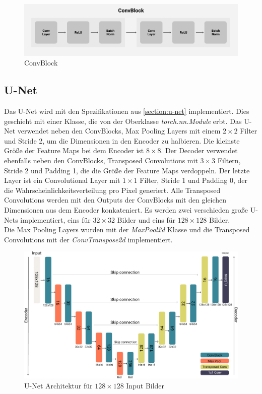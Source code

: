 \begin{figure}[H]
  \centering
  \includegraphics[width=1\textwidth]{resources/networks/convblock.png}
  \caption{ConvBlock}
  \label{image:convBlock}
\end{figure}

\subsection{U-Net}
Das U-Net wird mit den Spezifikationen aus \ref{section:u-net} implementiert. Dies geschieht mit einer Klasse, die von der Oberklasse
\textit{torch.nn.Module} erbt. Das U-Net verwendet neben den ConvBlocks, Max Pooling Layers mit einem $2 \times 2$ Filter und Stride 2,
um die Dimensionen in den Encoder zu halbieren. Die kleinste Größe der Feature Maps bei dem Encoder ist $8 \times 8$. 
Der Decoder verwendet ebenfalls neben den ConvBlocks, Transposed Convolutions mit $3 \times 3$ 
Filtern, Stride 2 und Padding 1, die die Größe der Feature Maps verdoppeln. Der letzte Layer ist ein Convolutional Layer mit $1 \times 1$ Filter, 
Stride 1 und Padding 0, der die
Wahrscheinlichkeitsverteilung pro Pixel generiert. Alle Transposed Convolutions werden mit den Outputs der ConvBlocks mit den gleichen
Dimensionen aus dem Encoder konkateniert. 
Es werden zwei verschieden große U-Nets implementiert, eins für $32 \times 32$ Bilder und eins für 
$128 \times 128$ Bilder.
\\
Die Max Pooling Layers wurden mit der \textit{MaxPool2d} Klasse und die Transposed Convolutions mit der \textit{ConvTranspose2d} implementiert.

\begin{figure}[H]
  \centering
  \includegraphics[width=1\textwidth]{resources/networks/128u-net.png}
  \caption{U-Net Architektur für $128 \times 128$ Input Bilder}
  \label{image:128u-net}
\end{figure}


